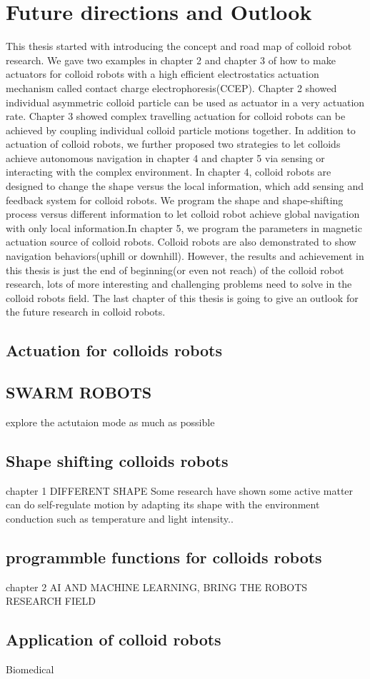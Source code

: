 \chapter{Future directions and Outlook}
This thesis started with introducing the concept and road map of colloid robot research. We gave two examples in chapter 2 and chapter 3 of how to make actuators for colloid robots with a high efficient electrostatics actuation mechanism called contact charge electrophoresis(CCEP). Chapter 2 showed individual asymmetric colloid particle can be used as actuator in a very actuation rate. Chapter 3 showed complex travelling actuation for colloid robots can be achieved by coupling individual colloid particle motions together.  In addition to actuation of colloid robots, we further proposed two strategies to let colloids achieve autonomous navigation in chapter 4 and chapter 5 via sensing or interacting with the complex environment. In chapter 4, colloid robots are designed to change the shape versus the local information, which add sensing and feedback system for colloid robots. We program the shape and shape-shifting process versus different information to let colloid robot achieve global navigation with only local information.In chapter 5, we program the parameters in magnetic  actuation source of colloid robots. Colloid robots are also demonstrated to show navigation behaviors(uphill or downhill). However, the results and achievement in this thesis is just the end of beginning(or even not reach) of the colloid robot research, lots of more interesting and challenging problems need to solve in the colloid robots field. The last chapter of this thesis is going to give an outlook for the future research in colloid robots.
\section{Actuation for  colloids robots}
\section{SWARM ROBOTS}
explore the actutaion mode as much as possible 
\section{Shape shifting colloids robots}
chapter 1
DIFFERENT SHAPE
Some research have shown some active matter can do self-regulate motion by adapting its shape with the environment conduction such as temperature and light intensity.\cite{tu2017self,li2018light}.


\section{programmble functions for colloids robots}
chapter 2
AI AND MACHINE LEARNING,
BRING THE ROBOTS RESEARCH FIELD
\section{Application of colloid robots}
Biomedical

